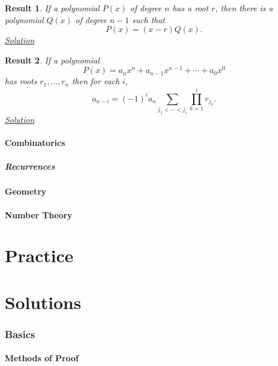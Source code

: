 \documentclass{amsart}
\newtheorem{result}{Result}[subsubsection]
\begin{document}
\begin{result}\label{r:n:a:polys:1}
  If a polynomial $P(x)$ of degree $n$ has a root $r$, then there is a
  polynomial $Q(x)$ of degree $n-1$ such that \[P(x)=(x-r)Q(x).\]
  \hyperlink{sr:n:a:polys:1}{Solution}
\end{result}
\begin{result}\label{r:n:a:polys:2}
  If a polynomial \[P(x)=a_n x^n+a_{n-1}x^{n-1}+\cdots+a_0x^0\] has roots
  $r_1,\ldots,r_n$ then for each $i$, \[a_{n-i}=(-1)^i a_n
  \sum_{j_1<\cdots<j_i} \prod_{k=1}^i r_{j_k}.\]
  \hyperlink{sr:n:a:polys:2}{Solution}
\end{result}
\subsection{Combinatorics}
\subsubsection{Recurrences}
\subsection{Geometry}
\subsection{Number Theory}
\newpage
\part{Practice}
\newpage
\part{Solutions}
\setcounter{section}{0}
\renewcommand*{\theHsection}{sols.\the\value{section}}
\section{Basics}
\subsection{Methods of Proof}
\end{document}
